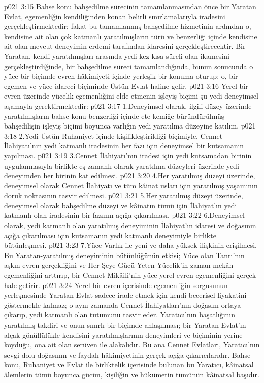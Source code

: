 \vs p021 3:15 Bahse konu bahşedilme sürecinin tamamlanmasından önce bir Yaratan Evlat, egemenliğin kendiliğinden konan belirli sınırlamalarıyla iradesini gerçekleştirmektedir; fakat bu tamamlanmış bahşedilme hizmetinin ardından o, kendisine ait olan çok katmanlı yaratılmışların türü ve benzerliği içinde kendisine ait olan mevcut deneyimin erdemi tarafından idaresini gerçekleştirecektir. Bir Yaratan, kendi yaratılmışları arasında yedi kez kısa süreli olan ikamesini gerçekleştirdiğinde, bir bahşedilme süreci tamamlandığında, bunun sonucunda o yüce bir biçimde evren hâkimiyeti içinde yerleşik bir konuma oturup; o, bir egemen ve yüce idareci biçiminde Üstün Evlat haline gelir.
\vs p021 3:16 Yerel bir evren üzerinde yücelik egemenliğini elde etmenin işleyiş biçimi şu yedi deneyimsel aşamayla gerektirmektedir:
\vs p021 3:17 1.\bibnobreakspace Deneyimsel olarak, ilgili düzey üzerinde yaratılmışların bahse konu benzerliği içinde ete kemiğe büründürülmüş bahşedilişin işleyiş biçimi boyunca varlığın yedi yaratılma düzeyine katılım.
\vs p021 3:18 2.\bibnobreakspace Yedi Üstün Ruhaniyet içinde kişilikleştirildiği biçimiyle, Cennet İlahiyatı’nın yedi katmanlı iradesinin her fazı için deneyimsel bir kutsamanın yapılması.
\vs p021 3:19 3.\bibnobreakspace Cennet İlahiyatı’nın iradesi için yedi kutsamadan birinin uygulanmasıyla birlikte eş zamanlı olarak yaratılma düzeyleri üzerinde yedi deneyimden her birinin kat edilmesi.
\vs p021 3:20 4.\bibnobreakspace Her yaratılmış düzeyi üzerinde, deneyimsel olarak Cennet İlahiyatı ve tüm kâinat usları için yaratılmış yaşamının doruk noktasının tasvir edilmesi.
\vs p021 3:21 5.\bibnobreakspace Her yaratılmış düzeyi üzerinde, deneyimsel olarak bahşedilme düzeyi ve kâinatın tümü için İlahiyat’ın yedi katmanlı olan iradesinin bir fazının açığa çıkarılması.
\vs p021 3:22 6.\bibnobreakspace Deneyimsel olarak, yedi katmanlı olan yaratılmış deneyiminin İlahiyat’ın idaresi ve doğasının açığa çıkarılması için kutsamanın yedi katmanlı deneyimiyle birlikte bütünleşmesi.
\vs p021 3:23 7.\bibnobreakspace Yüce Varlık ile yeni ve daha yüksek ilişkinin erişilmesi. Bu Yaratan\hyp{}yaratılmış deneyiminin bütünlüğünün etkisi; Yüce olan Tanrı’nın aşkın evren gerçekliğini ve Her Şeye Gücü Yeten Yücelik’in zaman\hyp{}mekân egemenliğini arttırıp, bir Cennet Mikâili’nin yüce yerel evren egemenliğini gerçek hale getirir.
\vs p021 3:24 Yerel bir evren içerisinde egemenliğin sorgusunun yerleşmesinde Yaratan Evlat sadece irade etmek için kendi becerisel liyakatini göstermekle kalmaz; o aynı zamanda Cennet İlahiyatları’nın doğasını ortaya çıkarıp, yedi katmanlı olan tutumunu tasvir eder. Yaratıcı’nın başatlığının yaratılmış takdiri ve onun sınırlı bir biçimde anlaşılması; bir Yaratan Evlat’ın alçak gönüllülükle kendisini yaratılmışlarının deneyimleri ve biçiminin yerine koyduğu, ona ait olan serüven ile alakalıdır. Bu ana Cennet Evlatları, Yaratıcı’nın sevgi dolu doğasının ve faydalı hâkimiyetinin gerçek açığa çıkarıcılarıdır. Bahse konu, Ruhaniyet ve Evlat ile birliktelik içerisinde bulunan bu Yaratıcı, kâinatsal âlemlerin tümü boyunca gücün, kişiliğin ve hükümetin tümünün kâinatsal başıdır.
